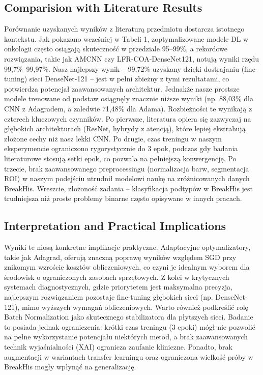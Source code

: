 \subsection{Comparision with Literature Results}
Porównanie uzyskanych wyników z literaturą przedmiotu dostarcza istotnego kontekstu. Jak pokazano wcześniej w Tabeli 1, zoptymalizowane modele DL w onkologii często osiągają skuteczność w przedziale 95–99\%, a rekordowe rozwiązania, takie jak AMCNN czy LFR-COA-DenseNet121, notują wyniki rzędu 99,7\%–99,97\%. Nasz najlepszy wynik – 99,72\% uzyskany dzięki dostrajaniu (fine-tuning) sieci DenseNet-121 – jest w pełni zbieżny z tymi rezultatami, co potwierdza potencjał zaawansowanych architektur.
Jednakże nasze prostsze modele trenowane od podstaw osiągnęły znacznie niższe wyniki (np. 88,03\% dla CNN z Adagradem, a zaledwie 71,48\% dla Adama). Rozbieżności te wynikają z czterech kluczowych czynników. Po pierwsze, literatura opiera się zazwyczaj na głębokich architekturach (ResNet, hybrydy z atencją), które lepiej ekstrahują złożone cechy niż nasz lekki CNN. Po drugie, czas treningu w naszym eksperymencie ograniczono rygorystycznie do 3 epok, podczas gdy badania literaturowe stosują setki epok, co pozwala na pełniejszą konwergencję. Po trzecie, brak zaawansowanego preprocessingu (normalizacja barw, segmentacja ROI) w naszym podejściu utrudnił modelowi naukę na zróżnicowanych danych BreakHis. Wreszcie, złożoność zadania – klasyfikacja podtypów w BreakHis jest trudniejsza niż proste problemy binarne często opisywane w innych pracach.

\subsection{Interpretation and Practical Implications}

Wyniki te niosą konkretne implikacje praktyczne. Adaptacyjne optymalizatory, takie jak Adagrad, oferują znaczną poprawę wyników względem SGD przy znikomym wzroście kosztów obliczeniowych, co czyni je idealnym wyborem dla środowisk o ograniczonych zasobach sprzętowych. Z kolei w krytycznych systemach diagnostycznych, gdzie priorytetem jest maksymalna precyzja, najlepszym rozwiązaniem pozostaje fine-tuning głębokich sieci (np. DenseNet-121), mimo wyższych wymagań obliczeniowych. Warto również podkreślić rolę Batch Normalization jako skutecznego stabilizatora dla płytszych sieci.
Badanie to posiada jednak ograniczenia: krótki czas treningu (3 epoki) mógł nie pozwolić na pełne wykorzystanie potencjału niektórych metod, a brak zaawansowanych technik wyjaśnialności (XAI) ogranicza zaufanie kliniczne. Ponadto, brak augmentacji w wariantach transfer learningu oraz ograniczona wielkość próby w BreakHis mogły wpłynąć na generalizację.



